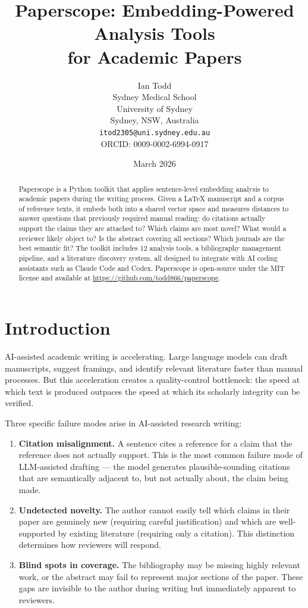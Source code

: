 \documentclass[11pt,a4paper]{article}
\title{Paperscope: Embedding-Powered Analysis Tools\\for Academic Papers}
\author{Ian Todd\\
Sydney Medical School\\
University of Sydney\\
Sydney, NSW, Australia\\
\texttt{itod2305@uni.sydney.edu.au}\\
ORCID: 0009-0002-6994-0917}
\date{March 2026}
\begin{document}
\maketitle

\begin{abstract}
Paperscope is a Python toolkit that applies sentence-level embedding analysis to academic papers during the writing process. Given a LaTeX manuscript and a corpus of reference texts, it embeds both into a shared vector space and measures distances to answer questions that previously required manual reading: do citations actually support the claims they are attached to? Which claims are most novel? What would a reviewer likely object to? Is the abstract covering all sections? Which journals are the best semantic fit? The toolkit includes 12 analysis tools, a bibliography management pipeline, and a literature discovery system, all designed to integrate with AI coding assistants such as Claude Code and Codex. Paperscope is open-source under the MIT license and available at \url{https://github.com/todd866/paperscope}.
\end{abstract}

\section{Introduction}

AI-assisted academic writing is accelerating. Large language models can draft manuscripts, suggest framings, and identify relevant literature faster than manual processes. But this acceleration creates a quality-control bottleneck: the speed at which text is produced outpaces the speed at which its scholarly integrity can be verified.

Three specific failure modes arise in AI-assisted research writing:

\begin{enumerate}
    \item \textbf{Citation misalignment.} A sentence cites a reference for a claim that the reference does not actually support. This is the most common failure mode of LLM-assisted drafting --- the model generates plausible-sounding citations that are semantically adjacent to, but not actually about, the claim being made.

    \item \textbf{Undetected novelty.} The author cannot easily tell which claims in their paper are genuinely new (requiring careful justification) and which are well-supported by existing literature (requiring only a citation). This distinction determines how reviewers will respond.

    \item \textbf{Blind spots in coverage.} The bibliography may be missing highly relevant work, or the abstract may fail to represent major sections of the paper. These gaps are invisible to the author during writing but immediately apparent to reviewers.
\end{enumerate}
\end{document}
